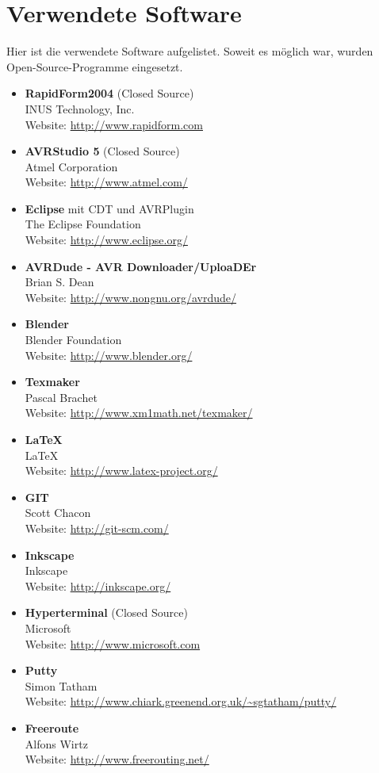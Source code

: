 \section{Verwendete Software}
\label{sec:V_Software}
Hier ist die verwendete Software aufgelistet. Soweit es möglich war, wurden Open-Source-Programme eingesetzt.
\begin{itemize}
\item \textbf{RapidForm2004} (Closed Source)\\
INUS Technology, Inc.\\
Website: \url{http://www.rapidform.com}
\item \textbf{AVRStudio 5}  (Closed Source)\\
Atmel Corporation \\
Website: \url{http://www.atmel.com/}  
\item \textbf{Eclipse} mit CDT und AVRPlugin\\
The Eclipse Foundation\\
Website: \url{http://www.eclipse.org/}  
\item \textbf{AVRDude - AVR Downloader/UploaDEr} \\
Brian S. Dean\\
Website: \url{http://www.nongnu.org/avrdude/}
\item \textbf{Blender}\\
Blender Foundation\\
Website: \url{http://www.blender.org/}
\item \textbf{Texmaker}\\
Pascal Brachet\\
Website: \url{http://www.xm1math.net/texmaker/}
\item \textbf{LaTeX}\\
LaTeX\\
Website: \url{http://www.latex-project.org/}
\item \textbf{GIT}\\
Scott Chacon\\
Website: \url {http://git-scm.com/}
\item \textbf{Inkscape}\\
Inkscape\\
Website: \url{http://inkscape.org/}
\item \textbf{Hyperterminal} (Closed Source)\\
Microsoft\\
Website: \url{http://www.microsoft.com}
\item \textbf{Putty}\\
Simon Tatham\\
Website: \url{http://www.chiark.greenend.org.uk/~sgtatham/putty/}
\item \textbf{Freeroute}\\
Alfons Wirtz\\
Website: \url{http://www.freerouting.net/}

\end{itemize}